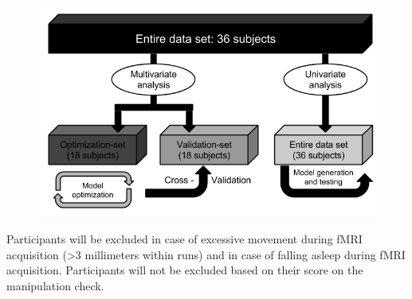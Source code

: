 \documentclass[12pt,a4paper]{article}\usepackage[]{graphicx}\usepackage[]{color}
\begin{document}
\begin{figure}[t]
\centering
\includegraphics[scale=.5]{ModelOptimization}
\end{figure}

Participants will be excluded in case of excessive movement during fMRI acquisition (\textgreater 3 millimeters within runs) and in case of falling asleep during fMRI acquisition. Participants will not be excluded based on their score on the manipulation check.

\end{document}
